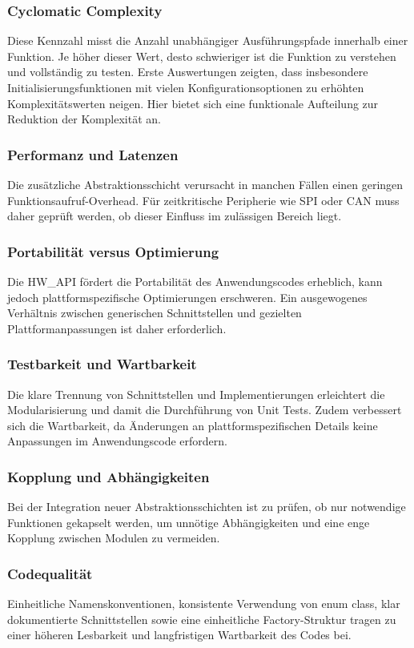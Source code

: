 \subsubsection{Cyclomatic Complexity}
Diese Kennzahl misst die Anzahl unabhängiger Ausführungspfade innerhalb einer Funktion. 
Je höher dieser Wert, desto schwieriger ist die Funktion zu verstehen und vollständig zu testen. 
Erste Auswertungen zeigten, dass insbesondere Initialisierungsfunktionen mit vielen Konfigurationsoptionen zu erhöhten Komplexitätswerten neigen. 
Hier bietet sich eine funktionale Aufteilung zur Reduktion der Komplexität an.

\subsubsection{Performanz und Latenzen}
Die zusätzliche Abstraktionsschicht verursacht in manchen Fällen einen geringen Funktionsaufruf-Overhead. Für zeitkritische Peripherie wie SPI oder CAN muss daher geprüft werden, ob dieser Einfluss im zulässigen Bereich liegt.

\subsubsection{Portabilität versus Optimierung}
Die HW\_API fördert die Portabilität des Anwendungscodes erheblich, kann jedoch plattformspezifische Optimierungen erschweren. Ein ausgewogenes Verhältnis zwischen generischen Schnittstellen und gezielten Plattformanpassungen ist daher erforderlich.

\subsubsection{Testbarkeit und Wartbarkeit}
Die klare Trennung von Schnittstellen und Implementierungen erleichtert die Modularisierung und damit die Durchführung von Unit Tests. Zudem verbessert sich die Wartbarkeit, da Änderungen an plattformspezifischen Details keine Anpassungen im Anwendungscode erfordern.

\subsubsection{Kopplung und Abhängigkeiten}
Bei der Integration neuer Abstraktionsschichten ist zu prüfen, ob nur notwendige Funktionen gekapselt werden, um unnötige Abhängigkeiten und eine enge Kopplung zwischen Modulen zu vermeiden.

\subsubsection{Codequalität}
Einheitliche Namenskonventionen, konsistente Verwendung von enum class, klar dokumentierte Schnittstellen sowie eine einheitliche Factory-Struktur tragen zu einer höheren Lesbarkeit und langfristigen Wartbarkeit des Codes bei.

